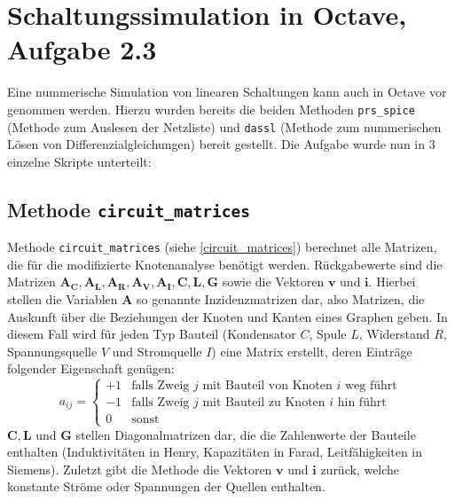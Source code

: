 \section*{Schaltungssimulation in Octave, Aufgabe 2.3}\label{sec:ag2.3}
Eine nummerische Simulation von linearen Schaltungen kann auch in Octave vor genommen werden. Hierzu wurden bereits die beiden Methoden \texttt{prs\_spice} (Methode zum Auslesen der Netzliste) und \texttt{dassl} (Methode zum nummerischen Lösen von Differenzialgleichungen) bereit gestellt.
Die Aufgabe wurde nun in 3 einzelne Skripte unterteilt:

\subsection*{Methode \texttt{circuit\_matrices}}
	Methode \texttt{circuit\_matrices} (siehe \ref{circuit_matrices}) berechnet alle Matrizen, die für die modifizierte Knotenanalyse benötigt werden. Rückgabewerte sind die Matrizen $\mathbf{A_C, A_L, A_R, A_V, A_I, C, L, G}$ sowie die Vektoren $\mathbf{v}$ und $\mathbf{i}$. Hierbei stellen die Variablen $\mathbf{A}$ so genannte Inzidenzmatrizen dar, also Matrizen, die Auskunft über die Beziehungen der Knoten und Kanten eines Graphen geben. In diesem Fall wird für jeden Typ Bauteil (Kondensator $C$, Spule $L$, Widerstand $R$, Spannungsquelle $V$ und Stromquelle $I$) eine Matrix erstellt, deren Einträge folgender Eigenschaft genügen:
	\begin{equation}
	a_{ij} = \begin{cases}
	+1 & \text{falls Zweig }j \text{ mit Bauteil von Knoten }i \text{ weg führt} \\
	-1 & \text{falls Zweig }j \text{ mit Bauteil zu Knoten }i \text{ hin führt} \\
	0  & \text{sonst}
	\end{cases}
	\end{equation}
	$\mathbf{C, L}$ und $\mathbf{G}$ stellen Diagonalmatrizen dar, die die Zahlenwerte der Bauteile enthalten (Induktivitäten in
	Henry, Kapazitäten in Farad, Leitfähigkeiten in Siemens). Zuletzt gibt die Methode die Vektoren $\mathbf{v}$ und $\mathbf{i}$ zurück, welche konstante Ströme oder Spannungen der Quellen enthalten.
	
